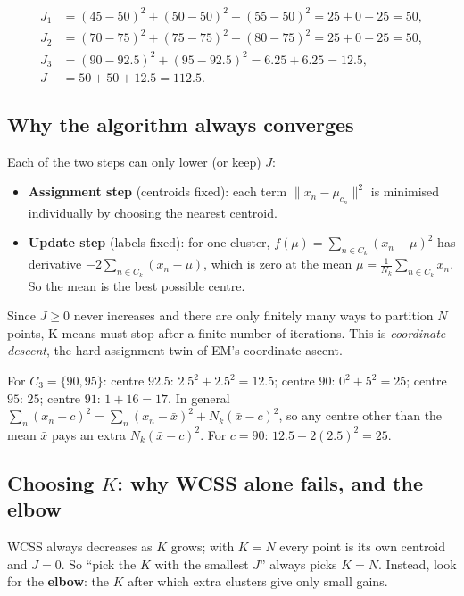 \documentclass[11pt,a4paper]{article}
\begin{document}
\begin{example}
\begin{align*}
J_1&=(45-50)^2+(50-50)^2+(55-50)^2=25+0+25=50,\\
J_2&=(70-75)^2+(75-75)^2+(80-75)^2=25+0+25=50,\\
J_3&=(90-92.5)^2+(95-92.5)^2=6.25+6.25=12.5,\\
J&=50+50+12.5=\mathbf{112.5}.
\end{align*}
\end{example}

\subsection{Why the algorithm always converges}

Each of the two steps can only lower (or keep) $J$:
\begin{itemize}[leftmargin=*]
\item \textbf{Assignment step} (centroids fixed): each term $\|x_n-\mu_{c_n}\|^2$ is minimised individually by choosing the nearest centroid.
\item \textbf{Update step} (labels fixed): for one cluster, $f(\mu)=\sum_{n\in C_k}(x_n-\mu)^2$ has derivative $-2\sum_{n\in C_k}(x_n-\mu)$, which is zero at the mean $\mu=\frac{1}{N_k}\sum_{n\in C_k}x_n$. So the mean is the best possible centre.
\end{itemize}
Since $J\ge0$ never increases and there are only finitely many ways to partition $N$ points, K-means must stop after a finite number of iterations. This is \emph{coordinate descent}, the hard-assignment twin of EM's coordinate ascent.

\begin{example}
For $C_3=\{90,95\}$:
centre $92.5$: $2.5^2+2.5^2=12.5$; \quad centre $90$: $0^2+5^2=25$; \quad centre $95$: $25$; \quad centre $91$: $1+16=17$.
In general $\sum_n(x_n-c)^2=\sum_n(x_n-\bar x)^2+N_k(\bar x-c)^2$, so any centre other than the mean $\bar x$ pays an extra $N_k(\bar x-c)^2$. For $c=90$: $12.5+2(2.5)^2=25$. \checkmark
\end{example}

\subsection{Choosing \texorpdfstring{$K$}{K}: why WCSS alone fails, and the elbow}

WCSS always decreases as $K$ grows; with $K=N$ every point is its own centroid and $J=0$. So ``pick the $K$ with the smallest $J$'' always picks $K=N$. Instead, look for the \textbf{elbow}: the $K$ after which extra clusters give only small gains.
\end{document}
